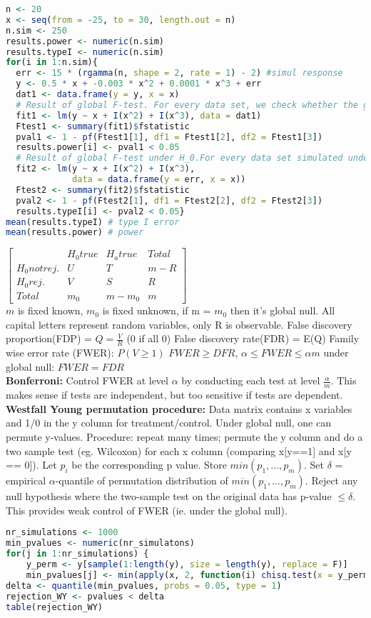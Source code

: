 \begin{lstlisting}[language = R]
n <- 20
x <- seq(from = -25, to = 30, length.out = n)
n.sim <- 250
results.power <- numeric(n.sim)
results.typeI <- numeric(n.sim)
for(i in 1:n.sim){
  err <- 15 * (rgamma(n, shape = 2, rate = 1) - 2) #simul response
  y <- 0.5 * x + -0.003 * x^2 + 0.0001 * x^3 + err
  dat1 <- data.frame(y = y, x = x)
  # Result of global F-test. For every data set, we check whether the global null hypothesis is being rejected or not.
  fit1 <- lm(y ~ x + I(x^2) + I(x^3), data = dat1)
  Ftest1 <- summary(fit1)$fstatistic
  pval1 <- 1 - pf(Ftest1[1], df1 = Ftest1[2], df2 = Ftest1[3])
  results.power[i] <- pval1 < 0.05
  # Result of global F-test under H_0.For every data set simulated under H_0, we check whether the F-test is rejected.
  fit2 <- lm(y ~ x + I(x^2) + I(x^3),
             data = data.frame(y = err, x = x))
  Ftest2 <- summary(fit2)$fstatistic
  pval2 <- 1 - pf(Ftest2[1], df1 = Ftest2[2], df2 = Ftest2[3])
  results.typeI[i] <- pval2 < 0.05}
mean(results.typeI) # type I error
mean(results.power) # power
\end{lstlisting}
$\begin{bmatrix}
& H_0 true & H_a true& Total \\
H_0 not rej. & U & T & m-R\\
H_0rej. & V & S & R \\
Total & m_0 & m-m_0 & m
\end{bmatrix}$\\
$m$ is fixed known, $m_0$ is fixed unknown, if m = $m_0$ then it's global null. All capital letters represent random variables, only R is observable. 
False discovery proportion(FDP) = $Q = \frac{V}{R}$ (0 if all 0)
False discovery rate(FDR) = E(Q) 
Family wise error rate (FWER): $P(V \geq 1)$
$FWER \geq DFR$, $\alpha \leq FWER \leq \alpha m$ under global null: $FWER = FDR$ \\
\textbf{Bonferroni: } Control FWER at level $\alpha$ by conducting each test at level $\frac{\alpha}{m}$. This makes sense if tests are independent, but too sensitive if tests are dependent.  \\
\textbf{Westfall Young permutation procedure: } Data matrix contains x variables and 1/0 in the y column for treatment/control. Under global null, one can permute y-values. Procedure: repeat many times; permute the y column and do a two sample test (eg. Wilcoxon) for each x column (comparing x[y==1] and x[y == 0]). Let $p_i$ be the corresponding p value. Store $min(p_1,...,p_m)$. Set $\delta$ = empirical $\alpha$-quantile of permutation distribution of $min(p_1,...,p_m)$. Reject any null hypothesis where the two-sample test on the original data has p-value $\leq \delta$. This provides weak control of FWER (ie. under the global null). 
\begin{lstlisting}[language=R]
nr_simulations <- 1000
min_pvalues <- numeric(nr_simulatons)
for(j in 1:nr_simulations) {
    y_perm <- y[sample(1:length(y), size = length(y), replace = F)]
    min_pvalues[j] <- min(apply(x, 2, function(i) chisq.test(x = y_perm,y = i)$p.value))  }
delta <- quantile(min_pvalues, probs = 0.05, type = 1)
rejection_WY <- pvalues < delta
table(rejection_WY)
\end{lstlisting}

